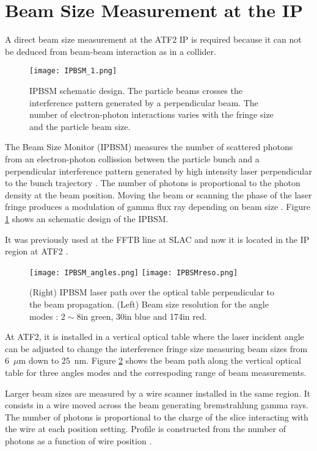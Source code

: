 {{\section{Beam Size Measurement at the IP}
A direct beam size measurement at the ATF2 IP is required because it can not be deduced from beam-beam interaction as in a collider.\par
\begin{figure}[htb]
 \begin{center}
  \texttt{[image: IPBSM\_1.png]}\caption{IPBSM schematic design. The particle beams crosses the interference pattern generated by a perpendicular beam. The number of electron-photon interactions varies with the fringe size and the particle beam size.}\label{f:IPBSM}
 \end{center}
\end{figure}
The Beam Size Monitor (IPBSM) measures the number of scattered photons from an electron-photon collission between the particle bunch and a perpendicular interference pattern generated by high intensity laser perpendicular to the bunch trajectory \cite{Shintake1992453}. The number of photons is proportional to the photon density at the beam position. Moving the beam or scanning the phase of the laser fringe produces a modulation of gamma flux ray depending on beam size \cite{Yves}. Figure \ref{f:IPBSM} shows an schematic design of the IPBSM.\par
It was previously used at the FFTB line at SLAC \cite{Shintake:1995sg} and now it is located in the IP region at ATF2 \cite{Jackelinethese}.\par
\begin{figure}[htb]
 \begin{center}
  \texttt{[image: IPBSM\_angles.png]}
  \texttt{[image: IPBSMreso.png]}
  \caption{(Right) IPBSM laser path over the optical table perpendicular to the beam propagation. (Left) Beam size resolution for the angle modes : $2\sim8$\degree in green, 30\degree in blue and 174\degree in red.}\label{f:IPBSMangles}
 \end{center}
\end{figure}
At ATF2, it is installed in a vertical optical table where the laser incident angle can be adjusted to change the interference fringe size measuring beam sizes from 6~$\mu$m down to 25~nm. Figure \ref{f:IPBSMangles} shows the beam path along the vertical optical table for three angles modes and the correspoding range of beam measurements.\par
Larger beam sizes are measured by a wire scanner installed in the same region. It consists in a wire moved across the beam generating bremstrahlung gamma rays. The number of photons is proportional to the charge of the slice interacting with the wire at each position setting. Profile is constructed from the number of photons as a function of wire position \cite{Hayano:2000xf}.

}}

